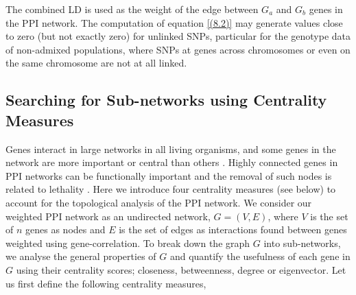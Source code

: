 \documentclass[10pt]{article}
\begin{document}
The combined LD is used as the weight of the edge between $G_{a}$ and $G_{b}$ genes in the PPI network. The computation of equation \ref{(8.2)} may generate values close to zero (but not exactly zero) for unlinked SNPs, particular for the genotype data of non-admixed populations, where SNPs at genes across chromosomes or even on the same chromosome are not at all linked.

\subsection*{Searching for Sub-networks using Centrality Measures} 
\label{searchnet}

Genes interact in large networks in all living organisms, and some genes in the network are more important or central than others \cite{lith}. Highly connected genes in PPI networks can be functionally important and the removal of such nodes is related to lethality \cite{lith}. Here we introduce four centrality measures (see below) to account for the topological analysis of the PPI network. We consider our weighted PPI network as an undirected network, $G=\left(V,E\right)$, where $V$ is the set of $n$ genes as nodes and $E$ is the set of edges as interactions found between genes weighted using gene-correlation. To break down the graph $G$ into sub-networks, we analyse the general properties of $G$ and quantify the usefulness of each gene in $G$ using their centrality scores; closeness, betweenness, degree or eigenvector. Let us first define the following centrality measures,
\end{document}
